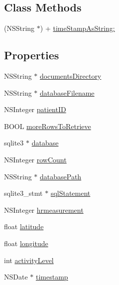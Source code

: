 \subsection*{Class Methods}
\begin{DoxyCompactItemize}
\item 
(N\-S\-String $\ast$) + \hyperlink{interface_d_b_manager_a7c8d65202b11dbd5c926bc6a01c4259d}{time\-Stamp\-As\-String\-:}
\end{DoxyCompactItemize}
\subsection*{Properties}
\begin{DoxyCompactItemize}
\item 
N\-S\-String $\ast$ \hyperlink{interface_d_b_manager_a2da5077535faad528421bada70121866}{documents\-Directory}
\item 
N\-S\-String $\ast$ \hyperlink{interface_d_b_manager_a725c101d5daf6506b59e0f7e06993982}{database\-Filename}
\item 
N\-S\-Integer \hyperlink{interface_d_b_manager_a7206acae059164df418a2dbfaa7fbb13}{patient\-I\-D}
\item 
B\-O\-O\-L \hyperlink{interface_d_b_manager_a921cb5034e1b4f79c6db59a1ce3fd579}{more\-Rows\-To\-Retrieve}
\item 
sqlite3 $\ast$ \hyperlink{interface_d_b_manager_aa3315763d817eb3c10dac39ee530e2a8}{database}
\item 
N\-S\-Integer \hyperlink{interface_d_b_manager_a7299e28bee3f75281496adcebb46010b}{row\-Count}
\item 
N\-S\-String $\ast$ \hyperlink{interface_d_b_manager_a15a4e85cdc292d83ee3d8b28e43c43bc}{database\-Path}
\item 
sqlite3\-\_\-stmt $\ast$ \hyperlink{interface_d_b_manager_ae714f21433f7593c722b727d2ae9c66a}{sql\-Statement}
\item 
N\-S\-Integer \hyperlink{interface_d_b_manager_ac89481f8c2c45def2b8edb2ba749df68}{hrmeasurement}
\item 
float \hyperlink{interface_d_b_manager_a12dcee066d2cecde8507a6529df92521}{latitude}
\item 
float \hyperlink{interface_d_b_manager_aa881cd8f0940350240e3ae9a326e5563}{longitude}
\item 
int \hyperlink{interface_d_b_manager_aff07ccf2439a2df78a5375303d5272a7}{activity\-Level}
\item 
N\-S\-Date $\ast$ \hyperlink{interface_d_b_manager_a62443c98d9fade6ab9906836bf146b72}{timestamp}
\end{DoxyCompactItemize}


